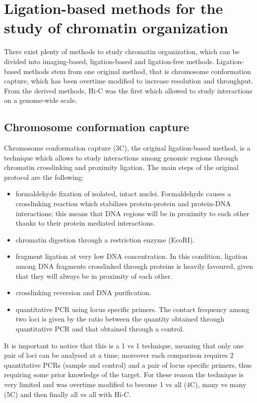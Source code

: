 \newpage
\section{Ligation-based methods for the study of chromatin organization}

There exist plenty of methods to study chromatin organization, which can be divided into imaging-based, ligation-based and ligation-free methods. Ligation-based methods stem from one original method, that is chromosome conformation capture, which has been overtime modified to increase resolution and throughput. From the derived methods, Hi-C was the first which allowed to study interactions on a genome-wide scale.

\subsection{Chromosome conformation capture}
Chromosome conformation capture (3C), the original ligation-based method, is a technique which allows to study interactions among genomic regions through chromatin crosslinking and proximity ligation\cite{3coriginal2002}. The main steps of the original protocol are the following:
\begin{itemize}\tightlist
  \item formaldehyde fixation of isolated, intact nuclei. Formaldehyde causes a crosslinking reaction which stabilizes protein-protein and protein-DNA interactions; this means that DNA regions will be in proximity to each other thanks to their protein mediated interactions. 
  \item chromatin digestion through a restriction enzyme (EcoRI).
  \item fragment ligation at very low DNA concentration. In this condition, ligation among DNA fragments crosslinked through proteins is heavily favoured, given that they will always be in proximity of each other.
  \item crosslinking reversion and DNA purification.
  \item quantitative PCR using locus specific primers. The contact frequency among two loci is given by the ratio between the quantity obtained through quantitative PCR and that obtained through a control.
\end{itemize}
It is important to notice that this is a 1 vs 1 technique, meaning that only one pair of loci can be analysed at a time; moreover each comparison requires 2 quantitative PCRs (sample and control) and a pair of locus specific primers, thus requiring some prior knowledge of the target. For these reason the technique is very limited and was overtime modified to become 1 vs all (4C\cite{4cprotocol2006}), many vs many (5C\cite{5cprotocol2006}) and then finally all vs all with Hi-C.


